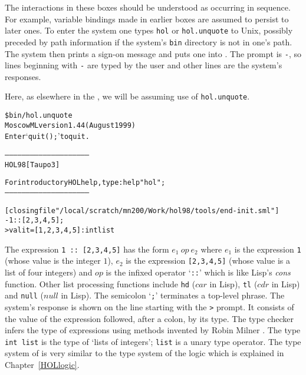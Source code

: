 The interactions in these boxes should be understood as occurring in
sequence.  For example, variable bindings made in earlier boxes are
assumed to persist to later ones.  To enter the \HOL{} system one types
{\small\verb|hol|} or {\small\verb|hol.unquote|} to Unix, possibly
  preceded by path information if the \HOL{} system's \texttt{bin}
  directory is not in one's path.  The \HOL{} system then prints a
  sign-on message and puts one into \ML.  The \ML{} prompt is
  {\small\verb|-|}, so lines beginning with {\small\verb|-|} are typed
  by the user and other lines are the system's responses.

  Here, as elsewhere in the \TUTORIAL{}, we will be assuming use of
  {\small\verb|hol.unquote|}.

\setcounter{sessioncount}{1}
\begin{session}\begin{alltt}
\$ bin/hol.unquote
Moscow ML version 1.44 (August 1999)
Enter `quit();' to quit.

-----------------------------------------------------------
           HOL98 [Taupo 3]

   For introductory HOL help, type: help "hol";
-----------------------------------------------------------

[closing file "/local/scratch/mn200/Work/hol98/tools/end-init.sml"]
- 1 :: [2,3,4,5];
> val it = [1, 2, 3, 4, 5] : int list
\end{alltt}
\end{session}

The \ML{} expression {\small\verb|1 :: [2,3,4,5]|} has the form $e_1\
op\ e_2$ where $e_1$ is the expression {\small\verb|1|} (whose value
is the integer $1$), $e_2$ is the expression {\small\verb|[2,3,4,5]|}
(whose value is a list of four integers) and $op$ is the infixed
operator `{\small\verb|::|}' which is like Lisp's {\it cons} function.
Other list processing functions include {\small\verb|hd|} ($car$ in
Lisp), {\small\verb|tl|} ($cdr$ in Lisp) and {\small\verb|null|}
($null$ in Lisp).  The semicolon `{\small\verb|;|}' terminates a
top-level phrase.  The system's response is shown on the line starting
with the {\small\verb|>|} prompt.  It consists of the value of the
expression followed, after a colon, by its type. The \ML{} type checker
infers the type of expressions using methods invented by Robin Milner
\cite{Milner-types}. The type {\small\verb|int list|} is the type of
`lists of integers'; {\small\verb|list|} is a unary type operator.
The type system of \ML{} is very similar to the type system of the
\HOL{} logic which is explained in Chapter~\ref{HOLlogic}.

